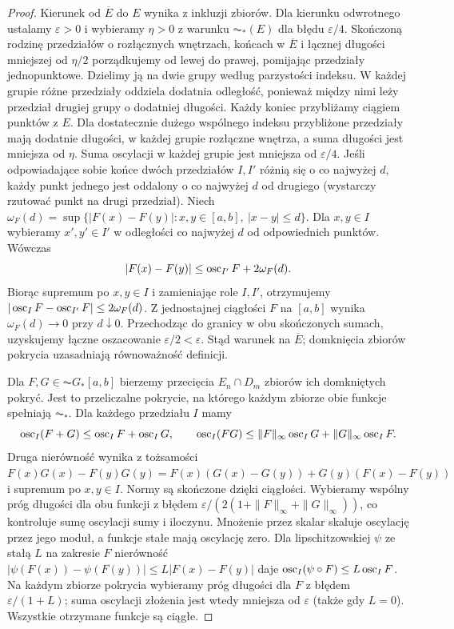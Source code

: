 \begin{proof}
Kierunek od $\overline E$ do $E$ wynika z inkluzji zbiorów.
Dla kierunku odwrotnego ustalamy $\varepsilon>0$ i wybieramy $\eta>0$ z warunku $\AC_*(E)$ dla błędu $\varepsilon/4$.
Skończoną rodzinę przedziałów o rozłącznych wnętrzach, końcach w $\overline E$ i łącznej długości mniejszej od $\eta/2$ porządkujemy od lewej do prawej, pomijając przedziały jednopunktowe.
Dzielimy ją na dwie grupy według parzystości indeksu. W każdej grupie różne przedziały oddziela dodatnia odległość, ponieważ między nimi leży przedział drugiej grupy o dodatniej długości.
Każdy koniec przybliżamy ciągiem punktów z $E$. Dla dostatecznie dużego wspólnego indeksu przybliżone przedziały mają dodatnie długości, w każdej grupie rozłączne wnętrza, a suma długości jest mniejsza od $\eta$. Suma oscylacji w każdej grupie jest mniejsza od $\varepsilon/4$.
Jeśli odpowiadające sobie końce dwóch przedziałów
$I,I'$ różnią się o co najwyżej $d$, każdy punkt jednego
jest oddalony o co najwyżej $d$ od drugiego (wystarczy
rzutować punkt na drugi przedział). Niech
$\omega_F(d)=\sup\{|F(x)-F(y)|:x,y\in[a,b],\ |x-y|\le d\}$.
Dla $x,y\in I$ wybieramy $x',y'\in I'$ w odległości
co najwyżej $d$ od odpowiednich punktów. Wówczas
\[
 |F(x)-F(y)|\le \operatorname{osc}_{I'}F+2\omega_F(d).
\]
Biorąc supremum po $x,y\in I$ i zamieniając role
$I,I'$, otrzymujemy
$|\operatorname{osc}_I F-\operatorname{osc}_{I'}F|\le2\omega_F(d)$.
Z jednostajnej ciągłości $F$ na $[a,b]$ wynika
$\omega_F(d)\to0$ przy $d\downarrow0$. Przechodząc do granicy w obu skończonych sumach, uzyskujemy łączne oszacowanie $\varepsilon/2<\varepsilon$.
Stąd warunek na $\overline E$; domknięcia zbiorów pokrycia uzasadniają równoważność definicji.

Dla $F,G\in\AC G_*[a,b]$ bierzemy przecięcia $E_n\cap D_m$ zbiorów ich domkniętych pokryć. Jest to przeliczalne pokrycie, na którego każdym zbiorze obie funkcje spełniają $\AC_*$. Dla każdego przedziału $I$ mamy
\[
 \operatorname{osc}_I(F+G)\le\operatorname{osc}_I F+\operatorname{osc}_I G,\qquad
 \operatorname{osc}_I(FG)\le\|F\|_\infty\operatorname{osc}_I G+\|G\|_\infty\operatorname{osc}_I F.
\]
Druga nierówność wynika z tożsamości
$F(x)G(x)-F(y)G(y)=F(x)(G(x)-G(y))+G(y)(F(x)-F(y))$ i supremum po $x,y\in I$.
Normy są skończone dzięki ciągłości. Wybieramy wspólny próg długości dla obu funkcji z błędem $\varepsilon/(2(1+\|F\|_\infty+\|G\|_\infty))$, co kontroluje sumę oscylacji sumy i iloczynu. Mnożenie przez skalar skaluje oscylację przez jego moduł, a funkcje stałe mają oscylację zero.
Dla lipschitzowskiej $\psi$ ze stałą $L$ na zakresie $F$
nierówność $|\psi(F(x))-\psi(F(y))|\le L|F(x)-F(y)|$
daje $\operatorname{osc}_I(\psi\circ F)\le L\operatorname{osc}_I F$.
Na każdym zbiorze pokrycia wybieramy próg długości
dla $F$ z błędem $\varepsilon/(1+L)$; suma oscylacji
złożenia jest wtedy mniejsza od $\varepsilon$
(także gdy $L=0$). Wszystkie otrzymane funkcje są ciągłe.
\end{proof}
